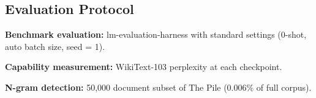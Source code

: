\subsection{Evaluation Protocol}

\textbf{Benchmark evaluation:} lm-evaluation-harness with standard settings (0-shot, auto batch size, seed = 1).

\textbf{Capability measurement:} WikiText-103 perplexity at each checkpoint.

\textbf{N-gram detection:} 50,000 document subset of The Pile (0.006\% of full corpus).
